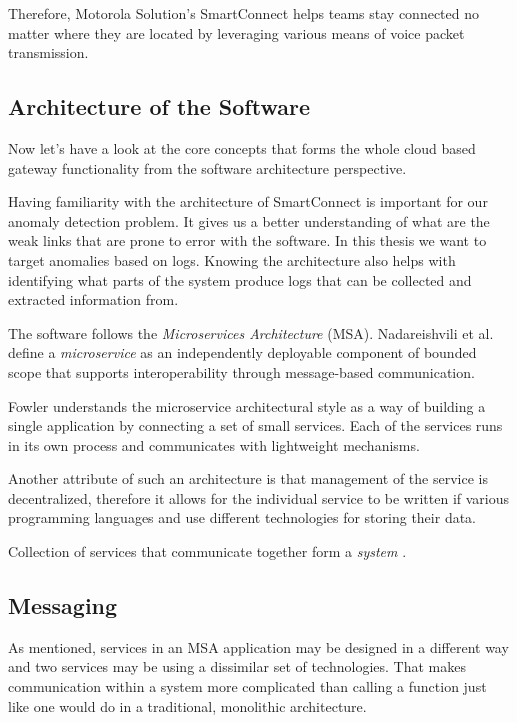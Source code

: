 Therefore, Motorola Solution's SmartConnect helps teams stay connected no matter where they are located by leveraging various means of voice packet transmission.

\subsection{Architecture of the Software}

Now let's have a look at the core concepts that forms the whole cloud based gateway functionality from the software architecture perspective. 

Having familiarity with the architecture of SmartConnect is important for our anomaly detection problem. It gives us a better understanding of what are the weak links that are prone to error with the software. 
In this thesis we want to target anomalies based on logs. Knowing the architecture also helps with identifying what parts of the system produce logs that can be collected and extracted information from.

The software follows the \textit{Microservices Architecture} (MSA).
Nadareishvili et al. \cite{nadareishvili2016microservice} define a \textit{microservice} as an independently deployable component of bounded scope that supports interoperability through message-based communication. 

Fowler \cite{fowler2014microservices} understands the microservice architectural style as a way of building a single application by connecting a set of small services. Each of the services runs in its own process and communicates with lightweight mechanisms.

Another attribute of such an architecture is that management of the service is decentralized, therefore it allows for the individual service to be written if various programming languages and use different technologies for storing their data.

Collection of services that communicate together form a \textit{system} \cite{indrasiri2018microservices}.

\subsection{Messaging}
\label{architecture:messaging}
As mentioned, services in an MSA application may be designed in a different way and two services may be using a dissimilar set of technologies. That makes communication within a system more complicated than calling a function just like one would do in a traditional, monolithic architecture.

